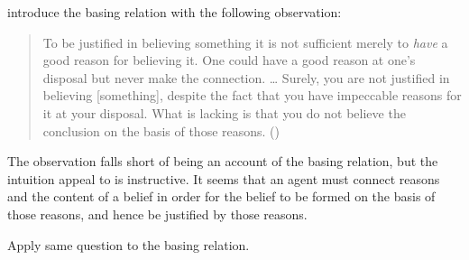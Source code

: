 \begin{note}
  \citeauthor{Pollock:1999tm} introduce the basing relation with the following observation:
  \begin{quote}
    To be justified in believing something it is not sufficient merely to \emph{have} a good reason for believing it.
    One could have a good reason at one's disposal but never make the connection.
    \dots
    Surely, you are not justified in believing [something], despite the fact that you have impeccable reasons for it at your disposal.
    What is lacking is that you do not believe the conclusion on the basis of those reasons.\linebreak
    \mbox{}\hfill\mbox{(\Citeyear[35]{Pollock:1999tm})}
  \end{quote}
  The observation falls short of being an account of the basing relation, but the intuition \citeauthor{Pollock:1999tm} appeal to is instructive.
  It seems that an agent must connect reasons and the content of a belief in order for the belief to be formed on the basis of those reasons, and hence be justified by those reasons.
\end{note}

\begin{note}
  Apply same question to the basing relation.
\end{note}

